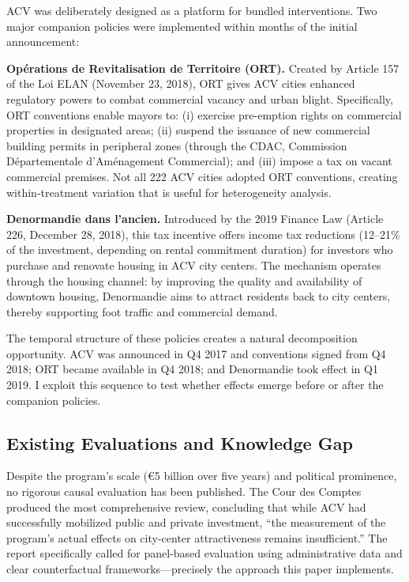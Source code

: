 \documentclass[12pt]{article}
\begin{document}
ACV was deliberately designed as a platform for bundled interventions. Two major companion policies were implemented within months of the initial announcement:

\textbf{Op\'erations de Revitalisation de Territoire (ORT).} Created by Article 157 of the Loi ELAN (November 23, 2018), ORT gives ACV cities enhanced regulatory powers to combat commercial vacancy and urban blight. Specifically, ORT conventions enable mayors to: (i) exercise pre-emption rights on commercial properties in designated areas; (ii) suspend the issuance of new commercial building permits in peripheral zones (through the CDAC, Commission D\'epartementale d'Am\'enagement Commercial); and (iii) impose a tax on vacant commercial premises. Not all 222 ACV cities adopted ORT conventions, creating within-treatment variation that is useful for heterogeneity analysis.

\textbf{Denormandie dans l'ancien.} Introduced by the 2019 Finance Law (Article 226, December 28, 2018), this tax incentive offers income tax reductions (12--21\% of the investment, depending on rental commitment duration) for investors who purchase and renovate housing in ACV city centers. The mechanism operates through the housing channel: by improving the quality and availability of downtown housing, Denormandie aims to attract residents back to city centers, thereby supporting foot traffic and commercial demand.

The temporal structure of these policies creates a natural decomposition opportunity. ACV was announced in Q4 2017 and conventions signed from Q4 2018; ORT became available in Q4 2018; and Denormandie took effect in Q1 2019. I exploit this sequence to test whether effects emerge before or after the companion policies.

\subsection{Existing Evaluations and Knowledge Gap}

Despite the program's scale (\euro 5 billion over five years) and political prominence, no rigorous causal evaluation has been published. The Cour des Comptes \citeyearpar{courdescomptes2022} produced the most comprehensive review, concluding that while ACV had successfully mobilized public and private investment, ``the measurement of the program's actual effects on city-center attractiveness remains insufficient.'' The report specifically called for panel-based evaluation using administrative data and clear counterfactual frameworks---precisely the approach this paper implements.
\end{document}
